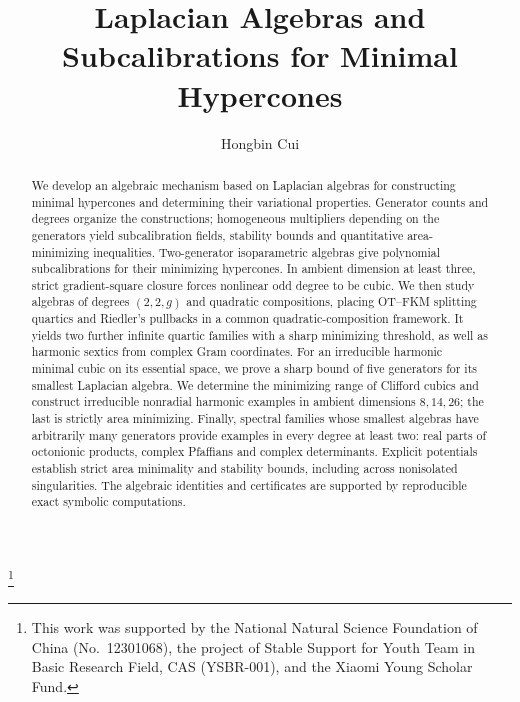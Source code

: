 \documentclass[11pt,a4paper]{amsart}
\numberwithin{equation}{section}
\theoremstyle{definition}
\theoremstyle{remark}
\begin{document}
\title[Laplacian Algebras and Subcalibrations]
{Laplacian Algebras and Subcalibrations for Minimal Hypercones}
\author{Hongbin Cui}
\address{Wu Wen-Tsun Key Laboratory of Mathematics, USTC,
Chinese Academy of Sciences, School of Mathematical Sciences,
University of Science and Technology of China, 96 Jinzhai Road,
Hefei, Anhui 230026, China}
\thanks{This work was supported by the National Natural Science Foundation
of China (No.~12301068), the project of Stable Support for
Youth Team in Basic Research Field, CAS (YSBR-001), and the Xiaomi Young
Scholar Fund.}
\date{}

\begin{abstract}
We develop an algebraic mechanism based on Laplacian algebras for
constructing minimal hypercones and determining their variational properties.
Generator counts and degrees organize the constructions; homogeneous
multipliers depending on the generators yield subcalibration fields,
stability bounds and quantitative area-minimizing inequalities.
Two-generator isoparametric algebras give polynomial subcalibrations
for their minimizing hypercones.
In ambient dimension at least three, strict gradient-square closure
forces nonlinear odd degree to be cubic. We then study algebras of degrees
$(2,2,g)$ and quadratic compositions, placing OT--FKM splitting quartics
and Riedler's pullbacks in a common quadratic-composition framework.
It yields two further infinite quartic families with a sharp minimizing
threshold, as well as harmonic sextics from complex Gram coordinates.
For an irreducible harmonic minimal cubic on its essential space, we
prove a sharp bound of five generators for its smallest Laplacian algebra.
We determine the minimizing range of Clifford cubics and construct
irreducible nonradial harmonic examples in ambient dimensions $8,14,26$;
the last is strictly area minimizing. Finally, spectral families
whose smallest algebras have arbitrarily many generators provide examples
in every degree at least two: real parts of octonionic products, complex Pfaffians and complex
determinants. Explicit potentials establish strict area minimality
and stability bounds, including across nonisolated singularities.
The algebraic identities and certificates are supported by reproducible
exact symbolic computations.
\end{abstract}
\maketitle
\end{document}
